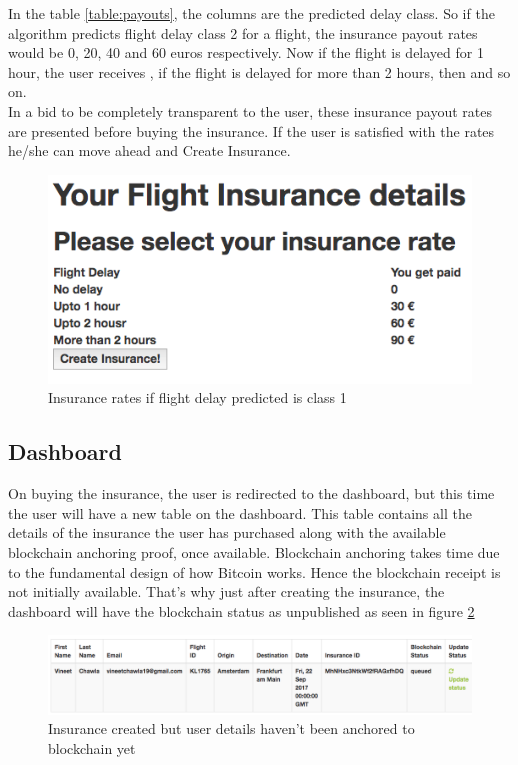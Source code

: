 In the table \ref{table:payouts}, the columns are the predicted delay class. So if the algorithm predicts flight delay class 2 for a flight, the insurance payout rates would be 0, 20, 40 and 60 euros respectively. Now if the flight is delayed for 1 hour, the user receives , if the flight is delayed for more than 2 hours, then  and so on.
\\In a bid to be completely transparent to the user, these insurance payout rates are presented before buying the insurance. If the user is satisfied with the rates he/she can move ahead and Create Insurance.

\begin{figure}[H]
    \centering
    \includegraphics[width=\textwidth]{Figures/insurance_rates.png}
    \caption{Insurance rates if flight delay predicted is class 1}
    \label{fig:insurance_rates}
\end{figure}

\subsection{Dashboard}
On buying the insurance, the user is redirected to the dashboard, but this time the user will have a new table on the dashboard. This table contains all the details of the insurance the user has purchased along with the available blockchain anchoring proof, once available. Blockchain anchoring takes time due to the fundamental design of how Bitcoin works. Hence the blockchain receipt is not initially available. That's why just after creating the insurance, the dashboard will have the blockchain status as unpublished as seen in figure \ref{fig:mid_dashboard}

\begin{figure}[H]
    \centering
    \includegraphics[width=\textwidth]{Figures/mid_dashboard.png}
    \caption{Insurance created but user details haven't been anchored to blockchain yet}
    \label{fig:mid_dashboard}
\end{figure}


